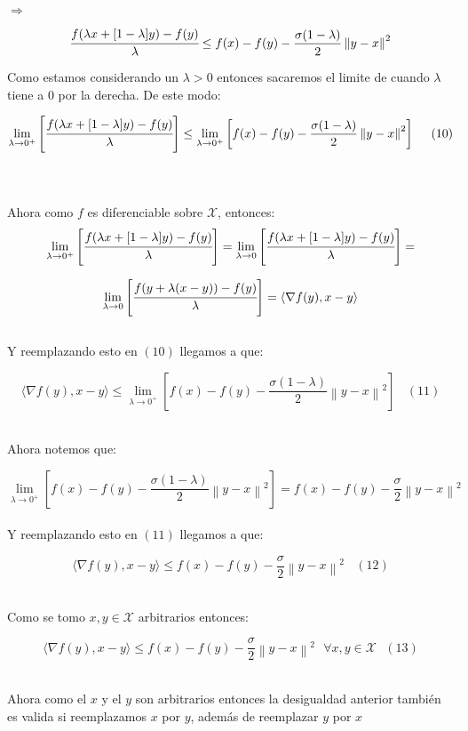 \documentclass[11pt]{article}
\begin{document}
$ \Rightarrow $ 

\[ \cfrac{f(\lambda x + [1-\lambda] y ) - f(y)}{\lambda} \leq  f(x)  -  f(y) - \frac{\sigma  (1-\lambda)}{2} \left\| y-x \right\|^{2}  \]

Como estamos considerando un $ \lambda > 0 $ entonces sacaremos el limite de cuando $ \lambda $ tiene a $0$ por la derecha. De este modo:

\[  \lim_{\lambda \to 0^+} \left[ \cfrac{f(\lambda x + [1-\lambda] y ) - f(y)}{\lambda} \right] \leq \lim_{\lambda \to 0^+} \left[ f(x)  -  f(y) - \frac{\sigma  (1-\lambda)}{2} \left\| y-x \right\|^{2}  \right] \ \ \ \ (10) \] \

$ \ $ 

Ahora como $ f $ es diferenciable sobre $ \mathcal{X}$, entonces: \\

\[ \lim_{\lambda \to 0^+} \left[ \cfrac{f(\lambda x + [1-\lambda] y ) - f(y)}{\lambda} \right] = \lim_{\lambda \to 0} \left[ \cfrac{f(\lambda x + [1-\lambda] y ) - f(y)}{\lambda} \right] =  \]

\[ \lim_{\lambda \to 0} \left[ \cfrac{f(y + \lambda (x-y) ) - f(y)}{\lambda} \right] = \langle \nabla f(y), x-y \rangle \] \\

Y reemplazando esto en $(10)$ llegamos a que:

\[   \langle \nabla f(y), x-y \rangle \leq \lim_{\lambda \to 0^+} \left[ f(x)  -  f(y) - \frac{\sigma  (1-\lambda)}{2} \left\| y-x \right\|^{2}  \right] \ \ \ \ (11) \] \

Ahora notemos que:

\[ \lim_{\lambda \to 0^+} \left[ f(x)  -  f(y) - \frac{\sigma  (1-\lambda)}{2} \left\| y-x \right\|^{2}  \right]  = f(x)  -  f(y) - \frac{\sigma}{2} \left\| y-x \right\|^{2}  \] \\

Y reemplazando esto en $(11)$ llegamos a que: \

\[   \langle \nabla f(y), x-y \rangle \leq f(x)  -  f(y) - \frac{\sigma}{2} \left\| y-x \right\|^{2} \ \ \ \ (12) \] \

Como se tomo $x,y \in \mathcal{X} $ arbitrarios entonces:

\[   \boxed{\langle \nabla f(y), x-y \rangle \leq f(x)  -  f(y) - \frac{\sigma}{2} \left\| y-x \right\|^{2} \ \ \ \forall x,y \in \mathcal{X} \ \ \ (13)} \] \

Ahora como el $x$ y el $y$ son arbitrarios entonces la desigualdad anterior también es valida si reemplazamos $ x $ por $ y $, además de reemplazar $ y $ por $x$ \
\end{document}
